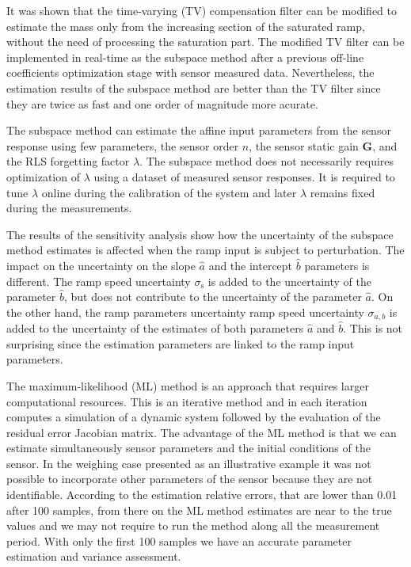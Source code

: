 {{It was shown that the time-varying (TV) compensation filter can be modified to estimate the mass only from the increasing section of the saturated ramp, without the need of processing the saturation part.
The modified TV filter can be implemented in real-time as the subspace method after a previous off-line coefficients optimization stage with sensor measured data.
Nevertheless, the estimation results of the subspace method are better than the TV filter since they are twice as fast and one order of magnitude more acurate.

The subspace method can estimate the affine input parameters from the sensor response using few parameters, the sensor order $n$, the sensor static gain $\mathbf{G}$, and the RLS forgetting factor $\lambda$.
The subspace method does not necessarily requires optimization of $\lambda$ using a dataset of measured sensor responses.
It is required to tune $\lambda$ online during the calibration of the system and later $\lambda$ remains fixed during the measurements.

The results of the sensitivity analysis show how the uncertainty of the subspace method estimates is affected when the ramp input is subject to perturbation.
The impact on the uncertainty on the slope $\widehat{a}$ and the intercept $\widehat{b}$ parameters is different.
The ramp speed uncertainty $\sigma_{\mathrm{s}}$ is added to the uncertainty of the parameter $\widehat{b}$, but does not contribute to the uncertainty of the parameter $\widehat{a}$.
On the other hand, the ramp parameters uncertainty ramp speed uncertainty $\sigma_{a,b}$ is added to the uncertainty of the estimates of both parameters $\widehat{a}$ and $\widehat{b}$.
This is not surprising since the estimation parameters are linked to the ramp input parameters.

The maximum-likelihood (ML) method is an approach that requires larger computational resources.
This is an iterative method and in each iteration computes a simulation of a dynamic system followed by the evaluation of the residual error Jacobian matrix.
The advantage of the ML method is that we can estimate simultaneously sensor parameters and the initial conditions of the sensor.
In the weighing case presented as an illustrative example it was not possible to incorporate other parameters of the sensor because they are not identifiable.
According to the estimation relative errors, that are lower than 0.01 after 100 samples, from there on the ML method estimates are near to the true values and we may not require to run the method along all the measurement period.
With only the first 100 samples we have an accurate parameter estimation and variance assessment.

}}
